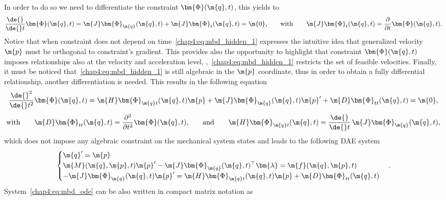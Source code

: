 In order to do so we need to differentiate the constraint $\bm{\Phi}(\m{q}, t)$, this yields to
%
\begin{equation}
  \dfrac{\de{}}{\de{} t}\bm{\Phi}(\m{q}, t) = \m{J}\bm{\Phi}_{\m{q}}(\m{q}, t) + \m{J}\bm{\Phi}_{t}(\m{q}, t) = \m{0}
  \text{,}
  \qquad \text{with} \qquad \m{J}\bm{\Phi}_{t}(\m{q}, t) = \dfrac{\partial}{\partial t}\bm{\Phi}(\m{q}, t)
  \text{.}
  \label{chap4:eq:mbd_hidden_1}
\end{equation}
%
Notice that when constraint does not depend on time~\eqref{chap4:eq:mbd_hidden_1} expresses the intuitive idea that generalized velocity $\m{p}$ must be orthogonal to constraint's gradient. This provides also the opportunity to highlight that constraint $\bm{\Phi}(\m{q}, t)$ imposes relationships also at the velocity and acceleration level, \ie{},~\eqref{chap4:eq:mbd_hidden_1} restricts the set of feasible velocities. Finally, it must be noticed that~\eqref{chap4:eq:mbd_hidden_1} is still algebraic in the $\m{p}$ coordinate, thus in order to obtain a fully differential relationship, another differentiation is needed. This results in the following equation
%
\begin{equation}
  \dfrac{\de{}^2}{\de{}t^2}\bm{\Phi}(\m{q}, t) = \m{H}\bm{\Phi}_{\m{q}t}(\m{q}, t)\m{p} + \m{J}\bm{\Phi}_{\m{q}}(\m{q}, t)\m{p}^{\prime} + \m{D}\bm{\Phi}_{tt}(\m{q}, t) = \m{0} \text{,}
  \label{chap4:eq:mbd_hidden_2}
\end{equation}
\begin{equation*}
  \text{with} \qquad
  \m{D}\bm{\Phi}_{tt}(\m{q}, t) = \dfrac{\partial^2}{\partial t^2}\bm{\Phi}(\m{q}, t) \text{,}
  \qquad \text{and} \qquad
  \m{H}\bm{\Phi}_{\m{q}t}(\m{q}, t) = \dfrac{\de{}}{\de{} t}\,\m{J}\bm{\Phi}_{\m{q}}(\m{q}, t) \text{,}
\end{equation*}
%
which does not impose any algebraic constraint on the mechanical system states and leads to the following \ac{DAE} system
%
\begin{equation}
  \begin{cases}
    \m{q}^{\prime} = \m{p} \\
    \m{M}(\m{q}, \m{p}, t)\m{p}^{\prime} - \m{J}\bm{\Phi}_{\m{q}}(\m{q}, t)^{\top}\bm{\lambda} = \m{f}(\m{q},\m{p},t) \\
    -\m{J}\bm{\Phi}_{\m{q}}(\m{q}, t)\m{p}^{\prime} = \m{H}\bm{\Phi}_{\m{q}t}(\m{q}, t)\m{p} + \m{D}\bm{\Phi}_{tt}(\m{q}, t)
  \end{cases} \text{.}
  \label{chap4:eq:mbd_ode}
\end{equation}
%
System~\eqref{chap4:eq:mbd_ode} can be also written in compact matrix notation as
